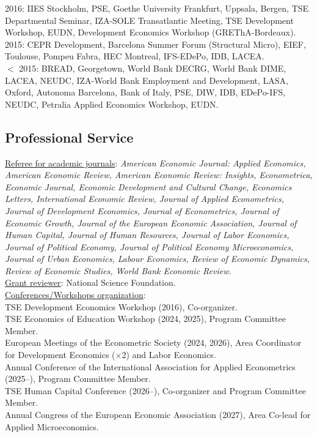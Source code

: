 \documentclass[12pt,english]{article}
\begin{document}
2016: IIES Stockholm, PSE, Goethe University Frankfurt, Uppsala, Bergen, TSE Departmental Seminar, IZA-SOLE Transatlantic Meeting, TSE Development Workshop, EUDN,  Development Economics Workshop (GREThA-Bordeaux).\vspace{0.2cm} \\
2015:  CEPR Development, Barcelona Summer Forum (Structural Micro), EIEF, Toulouse, Pompeu Fabra, HEC Montreal, IFS-EDePo, IDB, LACEA.  \vspace{0.2cm} \\
$<$ 2015: BREAD, Georgetown, World Bank DECRG, World Bank DIME, LACEA, NEUDC, IZA-World Bank Employment and Development, LASA, Oxford, Autonoma Barcelona, Bank of Italy, PSE, DIW, IDB, EDePo-IFS, NEUDC, Petralia Applied Economics Workshop, EUDN.  


\subsection*{Professional Service}

\noindent \underline{Referee for academic journals}: \textit{American Economic Journal: Applied Economics, American Economic Review, American Economic Review: Insights, Econometrica, Economic Journal, Economic Development and Cultural Change, Economics Letters, International Economic Review, Journal of Applied Econometrics, Journal of Development Economics, Journal of Econometrics, Journal of Economic Growth, Journal of the European Economic Association, Journal of Human Capital, Journal of Human Resources, Journal of Labor Economics, Journal of Political Economy,  Journal of Political Economy Microeconomics, Journal of Urban Economics, Labour Economics, Review of Economic Dynamics, Review of Economic Studies, World Bank Economic Review.} \\

\noindent \underline{Grant reviewer}: National Science Foundation. \\

\noindent \underline{Conferences/Workshops organization}:\\
TSE Development Economics Workshop (2016), Co-organizer.\vspace{0.2cm} \\
TSE Economics of Education Workshop (2024, 2025), Program Committee Member.\vspace{0.2cm} \\
European Meetings of the Econometric Society (2024, 2026), Area Coordinator for Development Economics ($\times$2) and Labor Economics.\vspace{0.2cm}\\
Annual Conference of the International Association for Applied Econometrics (2025--), Program Committee Member.\vspace{0.2cm}\\
TSE Human Capital Conference (2026--), Co-organizer and Program Committee Member.\vspace{0.2cm}\\
Annual Congress of the European Economic Association (2027), Area Co-lead for Applied Microeconomics.\\
\end{document}
